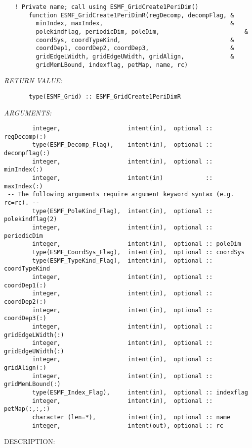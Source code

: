  
\begin{verbatim}   ! Private name; call using ESMF_GridCreate1PeriDim()
       function ESMF_GridCreate1PeriDimR(regDecomp, decompFlag, &
         minIndex, maxIndex,                                    &
         polekindflag, periodicDim, poleDim,                        &
         coordSys, coordTypeKind,                               &
         coordDep1, coordDep2, coordDep3,                       &
         gridEdgeLWidth, gridEdgeUWidth, gridAlign,             &
         gridMemLBound, indexflag, petMap, name, rc)
 \end{verbatim}{\em RETURN VALUE:}
\begin{verbatim}       type(ESMF_Grid) :: ESMF_GridCreate1PeriDimR\end{verbatim}{\em ARGUMENTS:}
\begin{verbatim}        integer,                   intent(in),  optional :: regDecomp(:)
        type(ESMF_Decomp_Flag),    intent(in),  optional :: decompflag(:)
        integer,                   intent(in),  optional :: minIndex(:)
        integer,                   intent(in)            :: maxIndex(:)
 -- The following arguments require argument keyword syntax (e.g. rc=rc). --
        type(ESMF_PoleKind_Flag),  intent(in),  optional :: polekindflag(2)
        integer,                   intent(in),  optional :: periodicDim
        integer,                   intent(in),  optional :: poleDim
        type(ESMF_CoordSys_Flag),  intent(in),  optional :: coordSys
        type(ESMF_TypeKind_Flag),  intent(in),  optional :: coordTypeKind
        integer,                   intent(in),  optional :: coordDep1(:)
        integer,                   intent(in),  optional :: coordDep2(:)
        integer,                   intent(in),  optional :: coordDep3(:)
        integer,                   intent(in),  optional :: gridEdgeLWidth(:)
        integer,                   intent(in),  optional :: gridEdgeUWidth(:)
        integer,                   intent(in),  optional :: gridAlign(:)
        integer,                   intent(in),  optional :: gridMemLBound(:)
        type(ESMF_Index_Flag),     intent(in),  optional :: indexflag
        integer,                   intent(in),  optional :: petMap(:,:,:)
        character (len=*),         intent(in),  optional :: name
        integer,                   intent(out), optional :: rc\end{verbatim}
{\sf DESCRIPTION:\\ }


